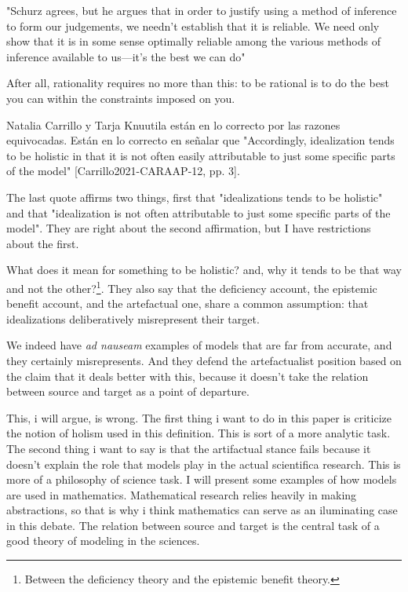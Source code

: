 "Schurz agrees, but he argues that in order to justify using a method of inference to form our judgements, we needn’t establish that it is reliable. We need only show that it is in some sense optimally reliable among the various methods of inference available to us—it’s the best we can do"


After all, rationality requires no more than this: to be rational is to do the best you can within the constraints imposed on you.

Natalia Carrillo y Tarja Knuutila están en lo correcto por las razones equivocadas.
Están en lo correcto en señalar que  "Accordingly, idealization tends to be holistic in that it is not often easily attributable to just some specific parts of the model" [Carrillo2021-CARAAP-12, pp. 3].

The last quote affirms two things, first that "idealizations tends to be holistic" and that "idealization is not often attributable to just some specific parts of the model".
They are right about the second affirmation, but I have restrictions about the first.

What does it mean for something to be holistic? and, why it tends to be that way and not the other?\footnote{Between the deficiency theory and the epistemic benefit theory.}.
They also say that the deficiency account, the epistemic benefit account, and the artefactual one, share a common assumption: that idealizations deliberatively misrepresent their target.

We indeed have \emph{ad nauseam} examples of models that are far from accurate, and they certainly misrepresents.
And they defend the artefactualist position based on the claim that it deals better with this, because it doesn't take the relation between source and target as a point of departure.

This, i will argue, is wrong. The first thing i want to do in this paper is criticize the notion of holism used in this definition.
This is sort of a more analytic task.
The second thing i want to say is that the artifactual stance fails because it doesn't explain the role that models play in the actual scientifica research.
This is more of a philosophy of science task.
I will present some examples of how models are used in mathematics.
Mathematical research relies heavily in making abstractions, so that is why i think mathematics can serve as an iluminating case in this debate.
The relation between source and target is the central task of a good theory of modeling in the sciences.

